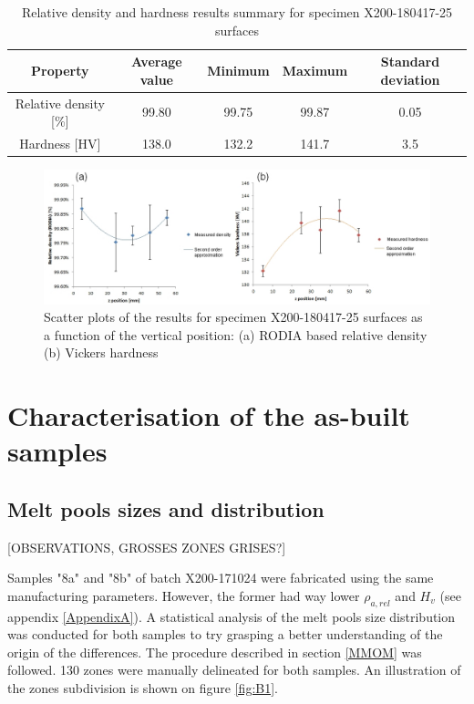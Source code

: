  \begin{center}
	\begin{table}[ht]
		\begin{tabular}{|c|c |c |c| c|}
			\hline
			Property& Average value & Minimum & Maximum & Standard deviation \\
			\hline 
			\hline   
			Relative density [\%] & 99.80 & 99.75 & 99.87 & 0.05\\
			Hardness [HV] &138.0 &132.2 &141.7&3.5\\
			\hline
		\end{tabular}

		\caption[Relative density and hardness results summary for specimen X200-180417-25 surfaces]{Relative density and hardness results summary for specimen X200-180417-25 surfaces}
		\label{tab:25}
	\end{table}
\end{center}


\begin{figure}[ht]
\centering
\centerline{\includegraphics[scale=0.62]{Images/SausHD}}
\decoRule
\caption[Scatter plots of the results for specimen X200-180417-25 surfaces as a function of the vertical position: (a) RODIA based relative density (b) Vickers hardness]{Scatter plots of the results for specimen X200-180417-25 surfaces as a function of the vertical position: (a) RODIA based relative density (b) Vickers hardness}
\label{fig:HD-180417}
\end{figure} 


\section{Characterisation of the as-built samples} 
\label{RCABS}
\subsection{Melt pools sizes and distribution}
[OBSERVATIONS, GROSSES ZONES GRISES?]

Samples "8a" and "8b" of batch X200-171024 were fabricated using the same manufacturing parameters. However, the former had way lower $\rho_{a,rel}$ and $H_v$ (see appendix \ref{AppendixA}). A statistical analysis of the melt pools size distribution was conducted for both samples to try grasping a better understanding of the origin of the differences. The procedure described in section \ref{MMOM} was followed. 130 zones were manually delineated for both samples. An illustration of the zones subdivision is shown on figure \ref{fig:B1}.\\

